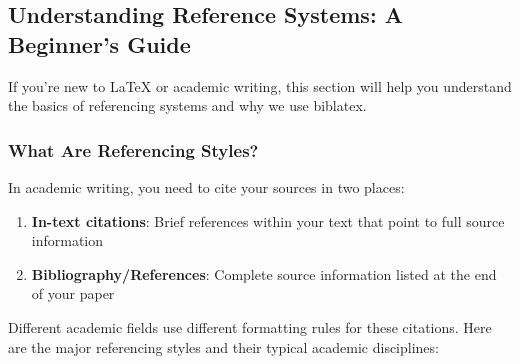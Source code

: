 \documentclass[11pt,a4paper]{ltxdoc}
\begin{document}
\subsection{Understanding Reference Systems: A Beginner's Guide}

If you're new to LaTeX or academic writing, this section will help you understand the basics of referencing systems and why we use \textsf{biblatex}.

\subsubsection{What Are Referencing Styles?}

In academic writing, you need to cite your sources in two places:

\begin{enumerate}
  \item \textbf{In-text citations}: Brief references within your text that point to full source information
  \item \textbf{Bibliography/References}: Complete source information listed at the end of your paper
\end{enumerate}

Different academic fields use different formatting rules for these citations. Here are the major referencing styles and their typical academic disciplines:
\end{document}
